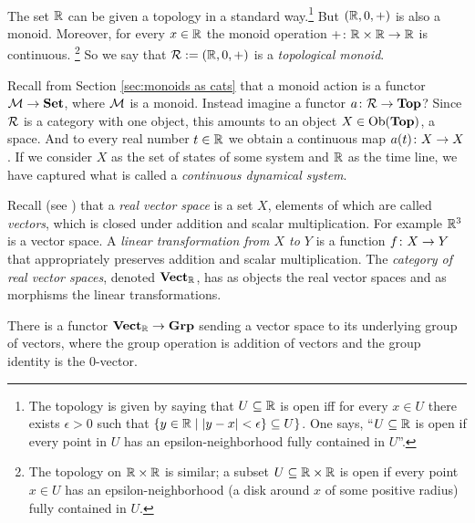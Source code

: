 \documentclass[CT4S-EN-RU]{subfiles}
\begin{document}
\begin{exerciseRUS}\label{exc:points and opens in Top}~
\end{exerciseRUS}

\begin{exampleENG}\label{ex:continuous dynamical systems}
The set ${\mathbb R}$ can be given a topology in a standard way.\footnote{The topology is given by saying that $U\subseteq{\mathbb R}$ is open iff for every $x\in U$ there exists $\epsilon>0$ such that $\{y\in {\mathbb R}{\;|\;} |y-x|<\epsilon\}\subseteq U\}$. One says, “$U\subseteq{\mathbb R}$ is open if every point in $U$ has an epsilon-neighborhood fully contained in $U$”.} But $({\mathbb R},0,+)$ is also a monoid. Moreover, for every $x\in{\mathbb R}$ the monoid operation $+\colon{\mathbb R}\times{\mathbb R}\rightarrow{\mathbb R}$ is continuous.
\footnote{The topology on ${\mathbb R}\times{\mathbb R}$ is similar; a subset $U\subseteq{\mathbb R}\times{\mathbb R}$ is open if every point $x\in U$ has an epsilon-neighborhood (a disk around $x$ of some positive radius) fully contained in $U$.}
So we say that $\mathcal{R}:=({\mathbb R},0,+)$ is a {\em topological monoid}.

Recall from Section \ref{sec:monoids as cats} that a monoid action is a functor $\mathcal{M}\rightarrow{\bf Set}$, where $\mathcal{M}$ is a monoid. Instead imagine a functor $a\colon\mathcal{R}\rightarrow{\bf Top}$? Since $\mathcal{R}$ is a category with one object, this amounts to an object $X\in\textnormal{Ob}({\bf Top})$, a space. And to every real number $t\in{\mathbb R}$ we obtain a continuous map $a(t)\colon X\rightarrow X$. If we consider $X$ as the set of states of some system and ${\mathbb R}$ as the time line, we have captured what is called a {\em continuous dynamical system}.
\end{exampleENG}

\begin{exampleRUS}\label{ex:continuous dynamical systems}
\end{exampleRUS}

\begin{exampleENG}
Recall (see \cite{Axl}) that a {\em real vector space} is a set $X$, elements of which are called {\em vectors}, which is closed under addition and scalar multiplication. For example ${\mathbb R}^3$ is a vector space. A {\em linear transformation from $X$ to $Y$} is a function $f\colon X\rightarrow Y$ that appropriately preserves addition and scalar multiplication. The {\em category of real vector spaces}, denoted ${\bf Vect}_{\mathbb R}$, has as objects the real vector spaces and as morphisms the linear transformations.

There is a functor ${\bf Vect}_{\mathbb R}\rightarrow{\bf Grp}$ sending a vector space to its underlying group of vectors, where the group operation is addition of vectors and the group identity is the 0-vector. 
\end{exampleENG}
\end{document}
